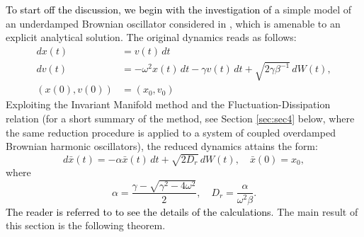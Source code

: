 \documentclass[a4paper,twoside]{article}      %
\theoremstyle{definition}
\newcommand{\AM}{\textcolor{black}}
\begin{document}
\AM{To start off the discussion, we begin with the investigation of a } simple model of an underdamped Brownian oscillator considered in \cite{CM22}, which is amenable to an explicit analytical solution.
The original dynamics reads as follows:
\begin{align*}
dx(t)&=v(t)\,dt\\
d v(t)&=-\omega^2 x(t)\,dt-\gamma v(t)\,dt+\sqrt{2\gamma\beta^{-1}}\,dW(t),\\
(x(0),v(0))&=(x_0,v_0)
\end{align*}
Exploiting the Invariant Manifold method and the Fluctuation-Dissipation relation (for a short summary of the method, see Section \ref{sec:sec4} below, where the same reduction procedure is applied to a system of coupled overdamped Brownian harmonic oscillators), the reduced dynamics attains the form: 
$$
d \bar{x}(t)=-\alpha \bar{x}(t)\,dt+\sqrt{2 D_r}\,dW(t),\quad \bar{x}(0)=x_0 ,
$$
where 
$$
\alpha=\frac{\gamma-\sqrt{\gamma^2-4\omega^2}}{2},\quad D_r=\frac{\alpha}{\omega^2\beta}.
$$ \AM{The reader is referred to \cite{CM22} to see the details of the calculations}. 
The main result of this section is the following theorem.
\end{document}
